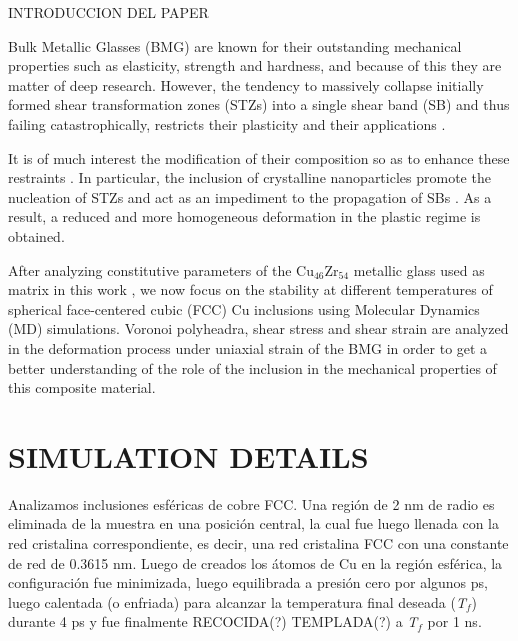 INTRODUCCION DEL PAPER

Bulk Metallic Glasses (BMG) are known for their outstanding mechanical properties such as elasticity, strength and hardness, and because of this they are matter of deep research. However, the tendency to massively collapse initially formed shear transformation zones (STZs) into a single shear band (SB) and thus failing catastrophically, restricts their plasticity and their applications \cite{cao09, xiao12}.

It is of much interest the modification of their composition so as to enhance these restraints \cite{albe13, adibi13, adibi14}. In particular, the inclusion of crystalline nanoparticles promote the nucleation of STZs and act as an impediment to the propagation of SBs \cite{albe13}. As a result, a reduced and more homogeneous deformation in the plastic regime is obtained.

After analyzing constitutive parameters of the Cu$_{46}$Zr$_{54}$ metallic glass used as matrix in this work \cite{ardiani12}, we now focus on the stability at different temperatures of spherical face-centered cubic (FCC) Cu inclusions using Molecular Dynamics (MD) simulations. Voronoi polyheadra, shear stress and shear strain are analyzed in the deformation process under uniaxial strain of the BMG in order to get a better understanding of the role of the inclusion in the mechanical properties of this composite material.

\section{SIMULATION DETAILS}



Analizamos inclusiones esféricas de cobre FCC. Una región de 2 nm de radio es eliminada de la muestra en una posición central, la cual fue luego llenada con la red cristalina correspondiente, es decir, una red cristalina FCC con una constante de red de 0.3615 nm. Luego de creados los átomos de Cu en la región esférica, la configuración fue minimizada, luego equilibrada a presión cero por algunos ps, luego calentada (o enfriada) para alcanzar la temperatura final deseada (\textit{T$_{f}$}) durante 4 ps y fue finalmente RECOCIDA(?) TEMPLADA(?) a \textit{T$_{f}$} por 1 ns.

